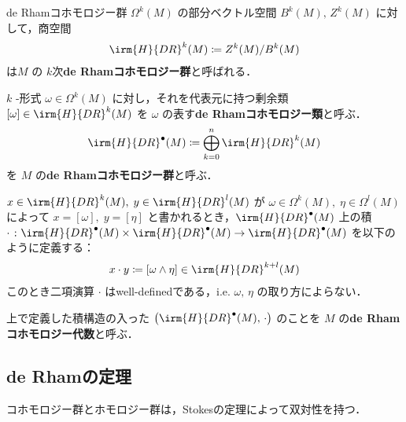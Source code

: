\documentclass[geometry_main]{subfiles}
\begin{document}
\begin{mydef}[label=def.deRham]{de Rhamコホモロジー群} 
	$\Omega^k(M)$ の部分ベクトル空間 $B^k(M),\, Z^k(M)$ に対して，商空間
	\begin{align} 
		\irm{H}{DR}^k(M) \coloneqq Z^k(M) / B^k(M)
	\end{align}
	は$M$ の $k$次\textbf{de Rhamコホモロジー群}と呼ばれる．

	$k$ -形式 $\omega \in \Omega^k(M)$ に対し，それを代表元に持つ剰余類 $[\omega] \in \irm{H}{DR}^k (M)$ を $\omega$ の表す\textbf{de Rhamコホモロジー類}と呼ぶ．
	\begin{align} 
		\irm{H}{DR}^\bullet(M) \coloneqq \bigoplus_{k=0}^n \irm{H}{DR}^k(M)
	\end{align}
	を $M$ の\textbf{de Rhamコホモロジー群}と呼ぶ．
\end{mydef}

$x \in \irm{H}{DR}^k(M),\; y \in \irm{H}{DR}^l(M)$ が $\omega \in \Omega^k(M),\; \eta \in \Omega^l(M)$ によって $x = [\omega],\; y = [\eta]$ と書かれるとき，$\irm{H}{DR}^\bullet(M)$ 上の積 $\cdot\mathrel{}\colon \irm{H}{DR}^\bullet(M) \times \irm{H}{DR}^\bullet(M) \to \irm{H}{DR}^\bullet(M)$ を以下のように定義する：
\begin{align} 
	x \cdot y \coloneqq [\omega \wedge \eta] \in \irm{H}{DR}^{k+l}(M)
\end{align}
このとき二項演算 $\cdot$ はwell-definedである，i.e. $\omega,\, \eta$ の取り方によらない．

上で定義した積構造の入った $\bigl( \irm{H}{DR}^\bullet(M),\, \cdot \bigr)$ のことを $M$ の\textbf{de Rhamコホモロジー代数}と呼ぶ．

\subsection{de Rhamの定理}


コホモロジー群とホモロジー群は，Stokesの定理によって双対性を持つ．
\end{document}
